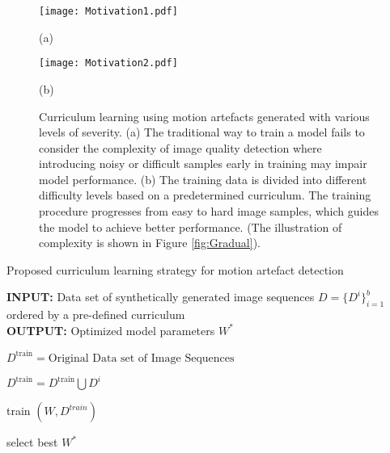 \documentclass[preprint,12pt,authoryear]{elsarticle}
\begin{document}
 \begin{figure}[tb]

\begin{minipage}[b]{0.38\linewidth}
  \centering
  \centerline{\texttt{[image: Motivation1.pdf]}}
  \centerline{(a)}\medskip
\end{minipage}
\hfill
\begin{minipage}[b]{0.57\linewidth}
  \centering
  \centerline{\texttt{[image: Motivation2.pdf]}}
  \centerline{(b)}\medskip
\end{minipage}
%
\hfill


\caption{Curriculum learning using motion artefacts generated with various levels of severity. (a) The  traditional  way  to  train  a  model  fails  to consider  the  complexity  of  image quality detection  where  introducing  noisy  or  difficult  samples  early  in  training  may impair model performance. (b) The training data is divided into  different  difficulty  levels  based  on  a  predetermined curriculum. The training procedure progresses from easy to hard image  samples, which guides the model to achieve better performance.  (The  illustration  of  complexity  is  shown  in Figure \ref{fig:Gradual}).}
\label{fig:MotivationCur}
%
\end{figure}






\begin{algorithm}[t]
\caption{Proposed curriculum learning strategy for motion artefact detection}\label{alg:algo1}


\begin{flushleft}
        \textbf{INPUT:}  Data set of synthetically generated image sequences $D=\{ D^{i}\}^{b}_{i=1} $ ordered by a pre-defined curriculum \\
        \textbf{OUTPUT:} Optimized model parameters $W^{*}$ 
\end{flushleft}


\begin{algorithmic}[1]

\State $D^{\text{train}}= \text{Original Data set of Image Sequences}$


\State $D^{\text{train}}=D^{\text{train}} \bigcup D^{i}$


\State train $(W, D^{train})$
\EndFor

\State select best  $W^{*}$ 
\EndFor


\end{algorithmic}
\end{algorithm}
\end{document}

